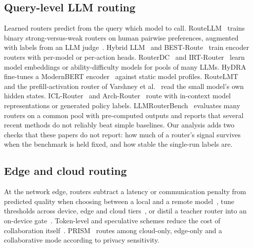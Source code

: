 \documentclass[lettersize,journal]{IEEEtran}
\begin{document}
\subsection{Query-level LLM routing}
Learned routers predict from the query which model to call. RouteLLM~\cite{Ong2025} trains binary strong-versus-weak routers on human pairwise preferences, augmented with labels from an LLM judge~\cite{zheng2023judging}. Hybrid LLM~\cite{ding2024hybridllm} and BEST-Route~\cite{ding2025bestroute} train encoder routers with per-model or per-action heads. RouterDC~\cite{chen2024routerdc} and IRT-Router~\cite{Song2025} learn model embeddings or ability-difficulty models for pools of many LLMs. HyDRA~\cite{garg2026hydra} fine-tunes a ModernBERT encoder~\cite{warner2025modernbert} against static model profiles. RouteLMT~\cite{Luo2026} and the prefill-activation router of Varshney et al.~\cite{varshney2026prefill} read the small model's own hidden states. ICL-Router~\cite{Wang2026} and Arch-Router~\cite{Tran2025} route with in-context model representations or generated policy labels. LLMRouterBench~\cite{dataset} evaluates many routers on a common pool with pre-computed outputs and reports that several recent methods do not reliably beat simple baselines. Our analysis adds two checks that these papers do not report: how much of a router's signal survives when the benchmark is held fixed, and how stable the single-run labels are.

\subsection{Edge and cloud routing}
At the network edge, routers subtract a latency or communication penalty from predicted quality when choosing between a local and a remote model~\cite{bao2025qualitylatency,chen2025netgptrouting}, tune thresholds across device, edge and cloud tiers~\cite{qiao2026consroute}, or distil a teacher router into an on-device gate~\cite{xue2026cr2}. Token-level and speculative schemes reduce the cost of collaboration itself~\cite{WZheng2025,CZheng2026,Xu2026}. PRISM~\cite{zhan2025prism} routes among cloud-only, edge-only and a collaborative mode according to privacy sensitivity.
\end{document}
